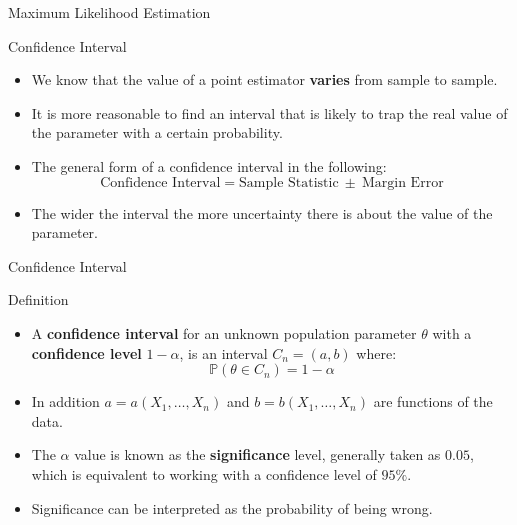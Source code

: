 \documentclass[handout]{beamer}
\begin{document}
\begin{frame}{Maximum Likelihood Estimation}
 
\end{frame}



\begin{frame}{Confidence Interval}
\scriptsize{
\begin{itemize}
 \item We know that the value of a point estimator \textbf{varies} from sample to sample.
 \item It is more reasonable to find an interval that is likely to trap the real value of the parameter with a certain probability.
 \item The general form of a confidence interval in the following:
  \begin{displaymath}
   \text{Confidence Interval} = \text{Sample Statistic} \ \pm \ \text{Margin Error}
  \end{displaymath}
 \item The wider the interval the more uncertainty there is about the value of the parameter.
\end{itemize}


}
 
\end{frame}


\begin{frame}{Confidence Interval }
\scriptsize{

\begin{block}{Definition}
\begin{itemize}
 \item A \textbf{confidence interval} for an unknown population parameter $\theta$ with a \textbf{confidence level} $1-\alpha$, is an interval $C_n = (a,b)$ where:
 \begin{displaymath}
 \mathbb{P}(\theta \in C_n) = 1-\alpha
\end{displaymath}
 \item In addition $a= a(X_1, \dots, X_n)$ and $b=b(X_1,\dots,X_n)$ are functions of the data.
 \item The $\alpha$ value is known as the \textbf{significance} level, generally taken as $0.05$, which is equivalent to working with a confidence level of $95\%$.
 \item Significance can be interpreted as the probability of being wrong.
\end{itemize}

\end{block}

}
 
\end{frame}
\end{document}
